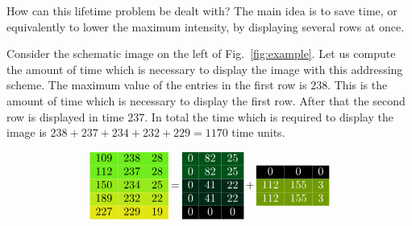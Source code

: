 How can this lifetime problem be dealt with? The main idea is to save
time, or equivalently to lower the maximum intensity, by displaying
several rows at once. 

Consider the schematic image on the left of Fig.~\ref{fig:example}.
Let us compute the amount of time which is
necessary to display the image with this addressing scheme.  The
maximum value of the entries in the first row is $238$. This is the
amount of time which is necessary to display the first row. After that
the second row is displayed in time $237$. In total the time which is
required to display the image is $238+237+234+232+229=1170$ time
units.

\begin{figure}[ht]
  \centering
  $$
\columnseprule5mm
\xdefinecolor{r1}{RGB}{109,238,28}
\xdefinecolor{r2}{RGB}{112,237,28}
\xdefinecolor{r3}{RGB}{150,234,25}
\xdefinecolor{r4}{RGB}{189,232,22}
\xdefinecolor{r5}{RGB}{227,229,19}
\begin{matrix}
\rowcolor{r1} 109 & 238 & 28 \\
\rowcolor{r2} 112 & 237 & 28 \\
\rowcolor{r3} 150 & 234 & 25 \\
\rowcolor{r4} 189 & 232 & 22 \\
\rowcolor{r5} 227 & 229 & 19
\end{matrix}
\>\> = \>\>
\xdefinecolor{m1}{RGB}{0,82,25}
\xdefinecolor{m2}{RGB}{112,155,3}
\xdefinecolor{m3}{RGB}{0,41,22}
\xdefinecolor{m4}{RGB}{189,191,0}
\begin{matrix}
\rowcolor{m1}    \color{white}0 & \color{white} 82 & \color{white}25 \\
\rowcolor{m1}    \color{white}0 & \color{white} 82 & \color{white}25 \\
\rowcolor{m3}    \color{white}0 & \color{white} 41 & \color{white}22 \\
\rowcolor{m3}    \color{white}0 & \color{white} 41 & \color{white}22 \\
\rowcolor{black} \color{white}0 & \color{white}  0 & \color{white} 0 \\
\end{matrix}
\>\> + \>\> 
\begin{matrix}
\rowcolor{black} \color{white} 0 & \color{white}  0 & \color{white} 0 \\
\rowcolor{m2} \color{white} 112 & \color{white} 155 & \color{white} 3 \\
\rowcolor{m2} \color{white} 112 & \color{white} 155 & \color{white} 3 \\

\end{matrix}$$
\end{figure}
